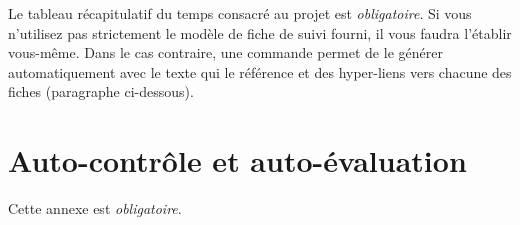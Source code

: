 \documentclass[11pt, french]{report-rd-info}
\begin{document}
\begin{fichesuivi}{}{}

	\begin{travaileffectue}
	\end{travaileffectue}

	\begin{travailnoneffectue}
	\end{travailnoneffectue}

	\begin{echange}
	\end{echange}

	\begin{planification}
	\end{planification}
\end{fichesuivi}

\begin{fichesuivi}{}{}

	\begin{travaileffectue}
	\end{travaileffectue}

	\begin{travailnoneffectue}
	\end{travailnoneffectue}

	\begin{echange}
	\end{echange}

	\begin{planification}
	\end{planification}
\end{fichesuivi}

Le tableau récapitulatif du temps consacré au projet est \emph{obligatoire}. Si vous n'utilisez pas strictement le modèle de fiche de suivi fourni, il vous faudra l'établir vous-même. Dans le cas contraire, une commande permet de le générer automatiquement avec le texte qui le référence et des hyper-liens vers chacune des fiches (paragraphe ci-dessous).

\printweeksummary

\chapter{Auto-contrôle et auto-évaluation}

Cette annexe est \emph{obligatoire}.
\end{document}
